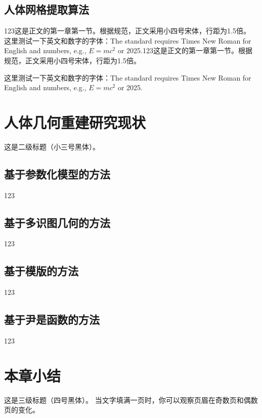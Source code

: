 \subsection{人体网格提取算法}
123这是正文的第一章第一节。根据规范，正文采用小四号宋体，行距为1.5倍。
这里测试一下英文和数字的字体：The standard requires Times New Roman for English and numbers, e.g., $E=mc^2$ or 2025.123这是正文的第一章第一节。根据规范，正文采用小四号宋体，行距为1.5倍。

这里测试一下英文和数字的字体：The standard requires Times New Roman for English and numbers, e.g., $E=mc^2$ or 2025.

\section{人体几何重建研究现状}
这是二级标题（小三号黑体）。

\subsection{基于参数化模型的方法}
123
\subsection{基于多识图几何的方法}
123
\subsection{基于模版的方法}
123
\subsection{基于尹是函数的方法}
123

\section{本章小结}
这是三级标题（四号黑体）。
当文字填满一页时，你可以观察页眉在奇数页和偶数页的变化。
